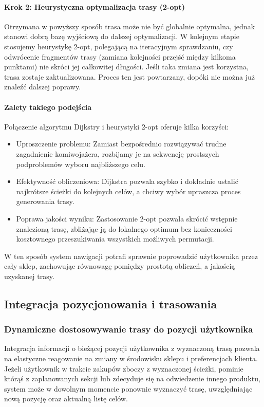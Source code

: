 \paragraph{Krok 2: Heurystyczna optymalizacja trasy (2-opt)}
Otrzymana w powyższy sposób trasa może nie być globalnie optymalna, jednak stanowi dobrą bazę wyjściową do dalszej optymalizacji. W kolejnym etapie stosujemy heurystykę 2-opt, polegającą na iteracyjnym sprawdzaniu, czy odwrócenie fragmentów trasy (zamiana kolejności przejść między kilkoma punktami) nie skróci jej całkowitej długości. Jeśli taka zmiana jest korzystna, trasa zostaje zaktualizowana. Proces ten jest powtarzany, dopóki nie można już znaleźć dalszej poprawy.

\paragraph{Zalety takiego podejścia}
Połączenie algorytmu Dijkstry i heurystyki 2-opt oferuje kilka korzyści:
\begin{itemize}
    \item Uproszczenie problemu: Zamiast bezpośrednio rozwiązywać trudne zagadnienie komiwojażera, rozbijamy je na sekwencję prostszych podproblemów wyboru najbliższego celu.
    \item Efektywność obliczeniowa: Dijkstra pozwala szybko i dokładnie ustalić najkrótsze ścieżki do kolejnych celów, a chciwy wybór upraszcza proces generowania trasy.
    \item Poprawa jakości wyniku: Zastosowanie 2-opt pozwala skrócić wstępnie znalezioną trasę, zbliżając ją do lokalnego optimum bez konieczności kosztownego przeszukiwania wszystkich możliwych permutacji.
\end{itemize}

W ten sposób system nawigacji potrafi sprawnie poprowadzić użytkownika przez cały sklep, zachowując równowagę pomiędzy prostotą obliczeń, a jakością uzyskanej trasy.

\subsection{Integracja pozycjonowania i trasowania}

\subsubsection{Dynamiczne dostosowywanie trasy do pozycji użytkownika}
Integracja informacji o bieżącej pozycji użytkownika z wyznaczoną trasą pozwala na elastyczne reagowanie na zmiany w środowisku sklepu i preferencjach klienta. Jeżeli użytkownik w trakcie zakupów zboczy z wyznaczonej ścieżki, pominie którąś z zaplanowanych sekcji lub zdecyduje się na odwiedzenie innego produktu, system może w dowolnym momencie ponownie wyznaczyć trasę, uwzględniając nową pozycję oraz aktualną listę celów.

